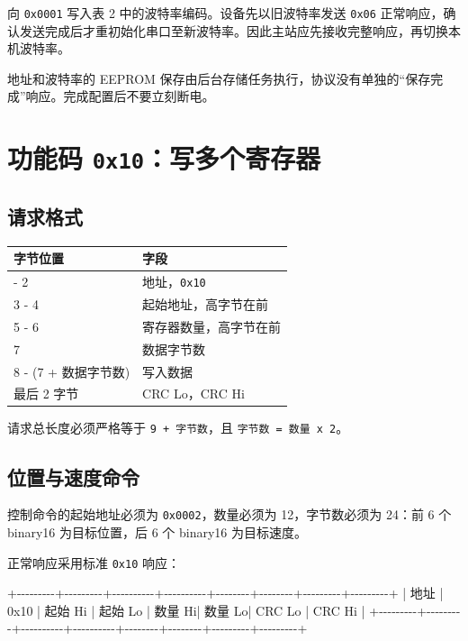 \documentclass[
  chinese,
]{ctexart}
\newenvironment{Shaded}{}{}
\newcommand{\NormalTok}[1]{#1}
\newcounter{none} %
\begin{document}
向 \texttt{0x0001} 写入表 2 中的波特率编码。设备先以旧波特率发送
\texttt{0x06}
正常响应，确认发送完成后才重初始化串口至新波特率。因此主站应先接收完整响应，再切换本机波特率。

地址和波特率的 EEPROM
保存由后台存储任务执行，协议没有单独的``保存完成''响应。完成配置后不要立刻断电。

\section{\texorpdfstring{功能码
\texttt{0x10}：写多个寄存器}{功能码 0x10：写多个寄存器}}\label{ux529fux80fdux7801-0x10ux5199ux591aux4e2aux5bc4ux5b58ux5668}

\subsection{请求格式}\label{ux8bf7ux6c42ux683cux5f0f-1}

{\def\LTcaptype{none} %
\begin{longtable}[]{@{}ll@{}}
\toprule\noalign{}
字节位置 & 字段 \\
\midrule\noalign{}
\endhead
\bottomrule\noalign{}
\endlastfoot
1 - 2 & 地址，\texttt{0x10} \\
3 - 4 & 起始地址，高字节在前 \\
5 - 6 & 寄存器数量，高字节在前 \\
7 & 数据字节数 \\
8 - (7 + 数据字节数) & 写入数据 \\
最后 2 字节 & CRC Lo，CRC Hi \\
\end{longtable}
}

请求总长度必须严格等于 \texttt{9\ +\ 字节数}，且
\texttt{字节数\ =\ 数量\ x\ 2}。

\subsection{位置与速度命令}\label{ux4f4dux7f6eux4e0eux901fux5ea6ux547dux4ee4}

控制命令的起始地址必须为 \texttt{0x0002}，数量必须为 12，字节数必须为
24：前 6 个 binary16 为目标位置，后 6 个 binary16 为目标速度。

正常响应采用标准 \texttt{0x10} 响应：

\begin{Shaded}
\begin{Highlighting}[]
\NormalTok{+{-}{-}{-}{-}{-}{-}{-}{-}{-}+{-}{-}{-}{-}{-}{-}{-}{-}{-}+{-}{-}{-}{-}{-}{-}{-}{-}{-}{-}+{-}{-}{-}{-}{-}{-}{-}{-}{-}{-}+{-}{-}{-}{-}{-}{-}{-}{-}+{-}{-}{-}{-}{-}{-}{-}{-}+{-}{-}{-}{-}{-}{-}{-}{-}{-}+{-}{-}{-}{-}{-}{-}{-}{-}{-}+}
\NormalTok{| 地址    | 0x10    | 起始 Hi  | 起始 Lo  | 数量 Hi| 数量 Lo| CRC Lo  | CRC Hi  |}
\NormalTok{+{-}{-}{-}{-}{-}{-}{-}{-}{-}+{-}{-}{-}{-}{-}{-}{-}{-}{-}+{-}{-}{-}{-}{-}{-}{-}{-}{-}{-}+{-}{-}{-}{-}{-}{-}{-}{-}{-}{-}+{-}{-}{-}{-}{-}{-}{-}{-}+{-}{-}{-}{-}{-}{-}{-}{-}+{-}{-}{-}{-}{-}{-}{-}{-}{-}+{-}{-}{-}{-}{-}{-}{-}{-}{-}+}
\end{Highlighting}
\end{Shaded}
\end{document}
